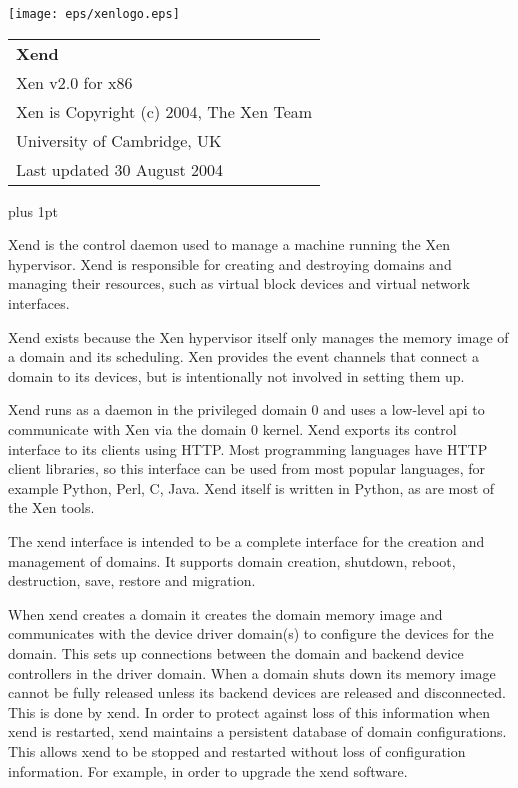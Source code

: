 \documentclass[11pt,twoside,final,openright]{xenstyle}
\begin{document}
\pagestyle{empty}
\begin{center}
\vspace*{\fill}
\texttt{[image: eps/xenlogo.eps]}
\vfill
\vfill
\vfill
\begin{tabular}{l}
{\Huge \bf Xend} \\[4mm]
{\huge Xen v2.0 for x86} \\[80mm]

{\Large Xen is Copyright (c) 2004, The Xen Team} \\[3mm]
{\Large University of Cambridge, UK} \\[20mm]
{\large Last updated 30 August 2004}
\end{tabular}
\vfill
\end{center}
\cleardoublepage

\pagestyle{plain}
{ \parskip 0pt plus 1pt
  \tableofcontents }
\cleardoublepage
\raggedbottom
{}
\parindent=0pt
\renewcommand{\topfraction}{.8}
\renewcommand{\bottomfraction}{.8}
\renewcommand{\textfraction}{.2}
\renewcommand{\floatpagefraction}{.8}


Xend is the control daemon used to manage a machine running the Xen hypervisor.
Xend is responsible for creating and destroying domains and managing their
resources, such as virtual block devices and virtual network interfaces.

Xend exists because the Xen hypervisor itself only manages the memory image
of a domain and its scheduling. Xen provides the event channels that connect
a domain to its devices, but is intentionally not involved in setting them up.

Xend runs as a daemon in the privileged domain 0 and uses a low-level api
to communicate with Xen via the domain 0 kernel. Xend exports its control
interface to its clients using HTTP. Most programming languages have
HTTP client libraries, so this interface can be used from most popular 
languages, for example Python, Perl, C, Java.
Xend itself is written in Python, as are most of the Xen tools.

The xend interface is intended to be a complete interface for the creation
and management of domains. It supports domain creation, shutdown, reboot,
destruction, save, restore and migration.

When xend creates a domain it creates the domain memory image and communicates
with the device driver domain(s) to configure the devices for the domain.
This sets up connections between the domain and backend device controllers
in the driver domain. When a domain shuts down its memory image cannot be fully released
unless its backend devices are released and disconnected. This is done by xend.
In order to protect against loss of this information when xend is restarted,
xend maintains a persistent database of domain configurations. This allows
xend to be stopped and restarted without loss of configuration information.
For example, in order to upgrade the xend software.
\end{document}
